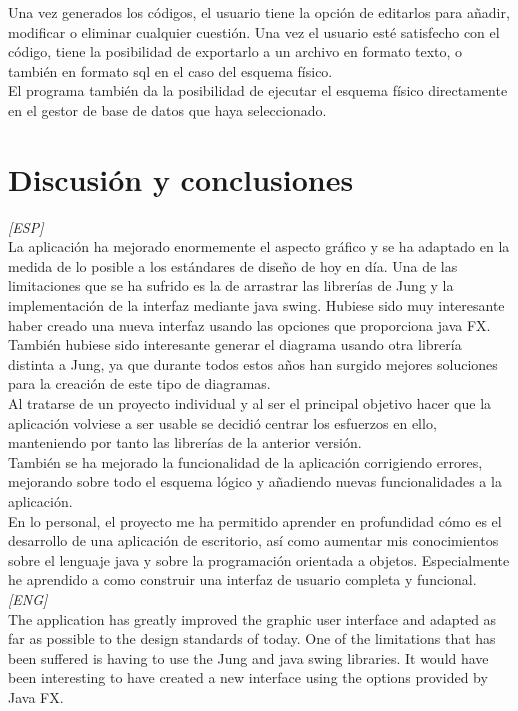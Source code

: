 Una vez generados los códigos, el usuario tiene la opción de editarlos para añadir, modificar o eliminar cualquier cuestión. Una vez el usuario esté satisfecho con el código, tiene la posibilidad de exportarlo a un archivo en formato texto, o también en formato sql en el caso del esquema físico.\\

El programa también da la posibilidad de ejecutar el esquema físico directamente en el gestor de base de datos que haya seleccionado.
\section{Discusión y conclusiones}%
\textit{[ESP]}\\
La aplicación ha mejorado enormemente el aspecto gráfico y se ha adaptado en la medida de lo posible a los estándares de diseño de hoy en día. Una de las limitaciones que se ha sufrido es la de arrastrar las librerías de Jung \cite{jung} y la implementación de la interfaz mediante java swing. Hubiese sido muy interesante haber creado una nueva interfaz usando las opciones que proporciona java FX.\\

También hubiese sido interesante generar el diagrama usando otra librería distinta a Jung, ya que durante todos estos años han surgido mejores soluciones para la creación de este tipo de diagramas.\\

Al tratarse de un proyecto individual y al ser el principal objetivo hacer que la aplicación volviese a ser usable se decidió centrar los esfuerzos en ello, manteniendo por tanto las librerías de la anterior versión.\\

También se ha mejorado la funcionalidad de la aplicación corrigiendo errores, mejorando sobre todo el esquema lógico y añadiendo nuevas funcionalidades a la aplicación.\\

En lo personal, el proyecto me ha permitido aprender en profundidad cómo es el desarrollo de una aplicación de escritorio, así como aumentar mis conocimientos sobre el lenguaje java y sobre la programación orientada a objetos. Especialmente he aprendido a como construir una interfaz de usuario completa y funcional.\\

\textit{[ENG]}\\

The application has greatly improved the graphic user interface and adapted as far as possible to the design standards of today. One of the limitations that has been suffered is having to use the Jung \cite{jung} and java swing libraries. It would have been interesting to have created a new interface using the options provided by Java FX.\\

